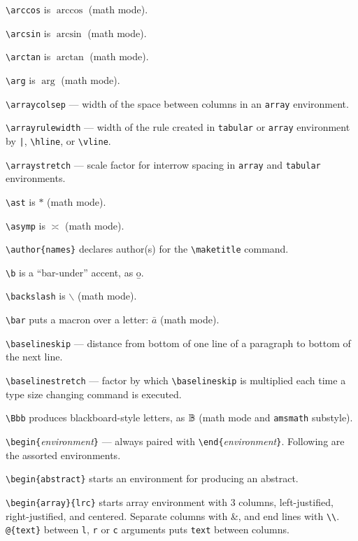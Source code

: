 \verb"\arccos" is $\arccos$ (math mode).

\verb"\arcsin" is $\arcsin$ (math mode).

\verb"\arctan" is $\arctan$ (math mode).

\verb"\arg" is $\arg$ (math mode).

\verb"\arraycolsep" --- width of the space between columns in an
	\verb"array" environment.

\verb"\arrayrulewidth" --- width of the rule created in \verb"tabular"
	or \verb"array" environment by \verb"|", \verb"\hline", or
	\verb"\vline".

\verb"\arraystretch" --- scale factor for interrow spacing in \verb"array"
	and \verb"tabular" environments.

\verb"\ast" is $\ast$ (math mode).

\verb"\asymp" is $\asymp$ (math mode).

\verb"\author{names}" declares author(s) for the \verb"\maketitle" command.

\verb"\b" is a ``bar-under'' accent, as \b o.

\verb"\backslash" is $\backslash$ (math mode).

\verb"\bar" puts a macron over a letter: $\bar a$ (math mode).

\verb"\baselineskip" --- distance from bottom of one line of a paragraph to
	bottom of the next line.

\verb"\baselinestretch" --- factor by which \verb"\baselineskip" is multiplied
	each time a type size changing command is executed.

\ifamsmath
\verb"\Bbb" produces blackboard-style letters, as $\Bbb B$ (math mode
	and \verb"amsmath" substyle).
\fi

\verb"\begin{"{\it environment\/}\verb"}" --- always paired with
	\ifsmallcrib \relax \else \linebreak \fi
	\verb"\end{"{\it environment\/}\verb"}".
	Following are the assorted environments.

\verb"\begin{abstract}" starts an environment for producing an abstract.

\verb"\begin{array}{lrc}" starts array environment with 3 columns,
	left-justified, right-justified, and centered. Separate columns
	with \&, and end lines with \verb"\\". \verb"@{text}" between
	\verb"l", \verb"r" or \verb"c" arguments puts \verb"text"
	between columns.

